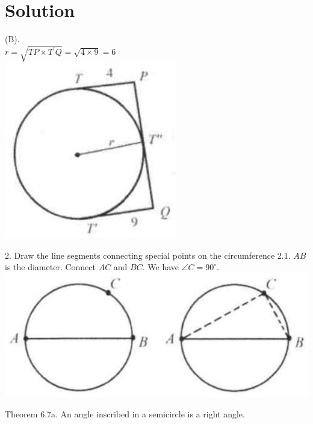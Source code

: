 \documentclass{article}
\begin{document}
\section*{Solution}
(B).\\
\(r=\sqrt{T P \times T^{\prime} Q}=\sqrt{4 \times 9}=6\)\\
\centering
\includegraphics[width=\textwidth]{images/161.jpg}


2. Draw the line segments connecting special points on the circumference
2.1. \(A B\) is the diameter. Connect \(A C\) and \(B C\). We have \(\angle C=90^{\circ}\).\\
\centering
\includegraphics[width=\textwidth]{images/162(1).jpg}

Theorem 6.7a. An angle inscribed in a semicircle is a right angle.
\end{document}
